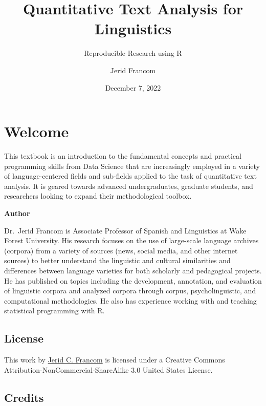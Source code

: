 \documentclass[
  letterpaper,
]{latex/krantz}
\title{Quantitative Text Analysis for Linguistics}
\subtitle{Reproducible Research using R}
\author{Jerid Francom}
\date{December 7, 2022}
\renewcommand*\contentsname{Table of contents}
\newcommand\contentsname{Table of contents}
\begin{document}
\maketitle
\ifdefined\Shaded\renewenvironment{Shaded}{\begin{tcolorbox}[colback={shadecolor}, enhanced, breakable, frame hidden, boxrule=0pt]}{\end{tcolorbox}}\fi

\renewcommand*\contentsname{Table of contents}
{
\hypersetup{linkcolor=}
\setcounter{tocdepth}{2}
\tableofcontents
}

\hypertarget{welcome}{%
\chapter*{Welcome}\label{welcome}}

This textbook is an introduction to the fundamental concepts and
practical programming skills from Data Science that are increasingly
employed in a variety of language-centered fields and sub-fields applied
to the task of quantitative text analysis. It is geared towards advanced
undergraduates, graduate students, and researchers looking to expand
their methodological toolbox.

\textbf{Author}

Dr.~Jerid Francom is Associate Professor of Spanish and Linguistics at
Wake Forest University. His research focuses on the use of large-scale
language archives (corpora) from a variety of sources (news, social
media, and other internet sources) to better understand the linguistic
and cultural similarities and differences between language varieties for
both scholarly and pedagogical projects. He has published on topics
including the development, annotation, and evaluation of linguistic
corpora and analyzed corpora through corpus, psycholinguistic, and
computational methodologies. He also has experience working with and
teaching statistical programming with R.

\hypertarget{license}{%
\section*{License}\label{license}}

This work by \href{https://francojc.github.io/}{Jerid C. Francom} is
licensed under a Creative Commons Attribution-NonCommercial-ShareAlike
3.0 United States License.

\hypertarget{credits}{%
\section*{Credits}\label{credits}}
\end{document}
